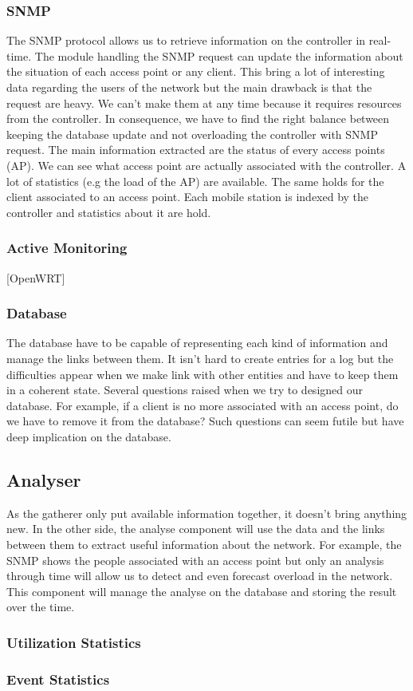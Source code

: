 \subsubsection{SNMP}
The SNMP protocol allows us to retrieve information on the controller in real-time. The module handling the SNMP request can update the information about the situation of each access point or any client. This bring a lot of interesting data regarding the users of the network but the main drawback is that the request are heavy. We can't make them at any time because it requires resources from the controller. In consequence, we have to find the right balance between keeping the database update and not overloading the controller with SNMP request.
The main information extracted are the status of every access points (AP). We can see what access point are actually associated with the controller. A lot of statistics (e.g the load of the AP) are available.
The same holds for the client associated to an access point. Each mobile station is indexed by the controller and statistics about it are hold.

\subsubsection{Active Monitoring}
[OpenWRT]

\subsubsection{Database}
The database have to be capable of representing each kind of information and manage the links between them. It isn't hard to create entries for a log but the difficulties appear when we make link with other entities and have to keep them in a coherent state. Several questions raised when we try to designed our database. For example, if a client is no more associated with an access point, do we have to remove it from the database? Such questions can seem futile but have deep implication on the database.

\subsection{Analyser}
As the gatherer only put available information together, it doesn't bring anything new. In the other side, the analyse component will use the data and the links between them to extract useful information about the network. For example, the SNMP shows the people associated with an access point but only an analysis through time will allow us to detect and even forecast overload in the network. This component will manage the analyse on the database and storing the result over the time.

\subsubsection{Utilization Statistics}



\subsubsection{Event Statistics}

